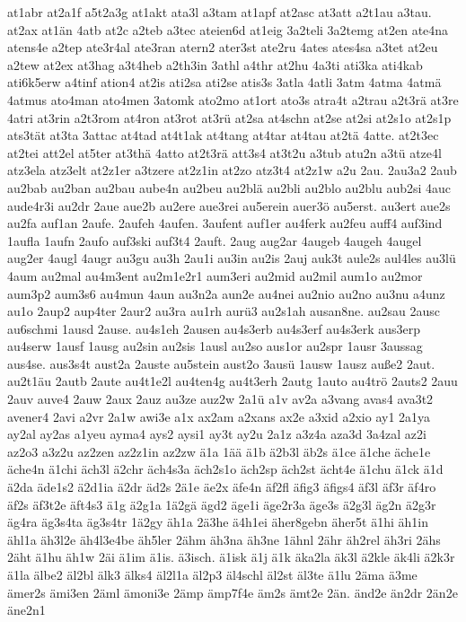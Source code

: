 {at1abr
at2a1f
a5t2a3g
at1akt
ata3l
a3tam
at1apf
at2asc
at3att
a2t1au
a3tau.
at2ax
at1än
4atb
at2c
a2teb
a3tec
ateien6d
at1eig
3a2teli
3a2temg
at2en
ate4na
atens4e
a2tep
ate3r4al
ate3ran
atern2
ater3st
ate2ru
4ates
ates4sa
a3tet
at2eu
a2tew
at2ex
at3hag
a3t4heb
a2th3in
3athl
a4thr
at2hu
4a3ti
ati3ka
ati4kab
ati6k5erw
a4tinf
ation4
at2is
ati2sa
ati2se
atis3s
3atla
4atli
3atm
4atma
4atmä
4atmus
ato4man
ato4men
3atomk
ato2mo
at1ort
ato3s
atra4t
a2trau
a2t3rä
at3re
4atri
at3rin
a2t3rom
at4ron
at3rot
at3rü
at2sa
at4schn
at2se
at2si
at2s1o
at2s1p
ats3tät
at3ta
3attac
at4tad
at4t1ak
at4tang
at4tar
at4tau
at2tä
4atte.
at2t3ec
at2tei
att2el
at5ter
at3thä
4atto
at2t3rä
att3s4
at3t2u
a3tub
atu2n
a3tü
atze4l
atz3ela
atz3elt
at2z1er
a3tzere
at2z1in
at2zo
atz3t4
at2z1w
a2u
2au.
2au3a2
2aub
au2bab
au2ban
au2bau
aube4n
au2beu
au2blä
au2bli
au2blo
au2blu
aub2si
4auc
aude4r3i
au2dr
2aue
aue2b
au2ere
aue3rei
au5erein
auer3ö
au5erst.
au3ert
aue2s
au2fa
auf1an
2aufe.
2aufeh
4aufen.
3aufent
auf1er
au4ferk
au2feu
auff4
auf3ind
1aufla
1aufn
2aufo
auf3ski
auf3t4
2auft.
2aug
aug2ar
4augeb
4augeh
4augel
aug2er
4augl
4augr
au3gu
au3h
2au1i
au3in
au2is
2auj
auk3t
aule2s
aul4les
au3lü
4aum
au2mal
au4m3ent
au2m1e2r1
aum3eri
au2mid
au2mil
aum1o
au2mor
aum3p2
aum3s6
au4mun
4aun
au3n2a
aun2e
au4nei
au2nio
au2no
au3nu
a4unz
au1o
2aup2
aup4ter
2aur2
au3ra
au1rh
aurü3
au2s1ah
ausan8ne.
au2sau
2ausc
au6schmi
1ausd
2ause.
au4s1eh
2ausen
au4s3erb
au4s3erf
au4s3erk
aus3erp
au4serw
1ausf
1ausg
au2sin
au2sis
1ausl
au2so
aus1or
au2spr
1ausr
3aussag
aus4se.
aus3s4t
aust2a
2auste
au5stein
aust2o
3ausü
1ausw
1ausz
auße2
2aut.
au2t1äu
2autb
2aute
au4t1e2l
au4ten4g
au4t3erh
2autg
1auto
au4trö
2auts2
2auu
2auv
auve4
2auw
2aux
2auz
au3ze
auz2w
2a1ü
a1v
av2a
a3vang
avas4
ava3t2
avener4
2avi
a2vr
2a1w
awi3e
a1x
ax2am
a2xans
ax2e
a3xid
a2xio
ay1
2a1ya
ay2al
ay2as
a1yeu
ayma4
ays2
aysi1
ay3t
ay2u
2a1z
a3z4a
aza3d
3a4zal
az2i
az2o3
a3z2u
az2zen
az2z1in
az2zw
ä1a
1ää
ä1b
ä2b3l
äb2s
ä1ce
ä1che
äche1e
äche4n
ä1chi
äch3l
ä2chr
äch4s3a
äch2s1o
äch2sp
äch2st
ächt4e
ä1chu
ä1ck
ä1d
ä2da
äde1s2
ä2d1ia
ä2dr
äd2s
2ä1e
äe2x
äfe4n
äf2fl
äfig3
äfigs4
äf3l
äf3r
äf4ro
äf2s
äf3t2e
äft4s3
ä1g
ä2g1a
1ä2gä
ägd2
äge1i
äge2r3a
äge3s
ä2g3l
äg2n
ä2g3r
äg4ra
äg3s4ta
äg3s4tr
1ä2gy
äh1a
2ä3he
ä4h1ei
äher8gebn
äher5t
ä1hi
äh1in
ähl1a
äh3l2e
äh4l3e4be
äh5ler
2ähm
äh3na
äh3ne
1ähnl
2ähr
äh2rel
äh3ri
2ähs
2äht
ä1hu
äh1w
2äi
ä1im
ä1is.
ä3isch.
ä1isk
ä1j
ä1k
äka2la
äk3l
ä2kle
äk4li
ä2k3r
ä1la
älbe2
äl2bl
älk3
älks4
äl2l1a
äl2p3
äl4schl
äl2st
äl3te
ä1lu
2äma
ä3me
ämer2s
ämi3en
2äml
ämoni3e
2ämp
ämp7f4e
äm2s
ämt2e
2än.
änd2e
än2dr
2än2e
äne2n1
}
